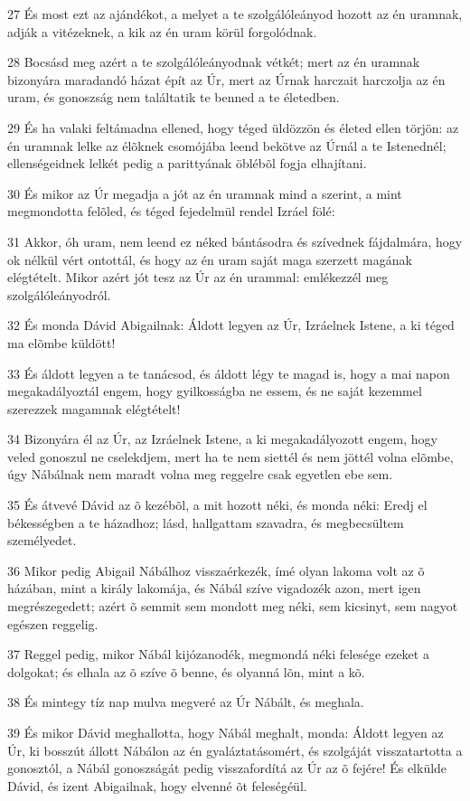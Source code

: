 \par 27 És most ezt az ajándékot, a melyet a te szolgálóleányod hozott az én uramnak, adják a vitézeknek, a kik az én uram körül forgolódnak.
\par 28 Bocsásd meg azért a te szolgálóleányodnak vétkét; mert az én uramnak bizonyára maradandó házat épít az Úr, mert az Úrnak harczait harczolja az én uram, és gonoszság nem találtatik te benned a te életedben.
\par 29 És ha valaki feltámadna ellened, hogy téged üldözzön és életed ellen törjön: az én uramnak lelke az élõknek csomójába leend bekötve az Úrnál a te Istenednél; ellenségeidnek lelkét pedig a parittyának öblébõl fogja elhajítani.
\par 30 És mikor az Úr megadja a jót az én uramnak mind a szerint, a mint megmondotta felõled, és téged fejedelmül rendel Izráel fölé:
\par 31 Akkor, óh uram, nem leend ez néked bántásodra és szívednek fájdalmára, hogy ok nélkül vért ontottál, és hogy az én uram saját maga szerzett magának elégtételt. Mikor azért jót tesz az Úr az én urammal: emlékezzél meg szolgálóleányodról.
\par 32 És monda Dávid Abigailnak: Áldott legyen az Úr, Izráelnek Istene, a ki téged ma elõmbe küldött!
\par 33 És áldott legyen a te tanácsod, és áldott légy te magad is, hogy a mai napon megakadályoztál engem, hogy gyilkosságba ne essem, és ne saját kezemmel szerezzek magamnak elégtételt!
\par 34 Bizonyára él az Úr, az Izráelnek Istene, a ki megakadályozott engem, hogy veled gonoszul ne cselekdjem, mert ha te nem siettél és nem jöttél volna elõmbe, úgy Nábálnak nem maradt volna meg reggelre csak egyetlen ebe sem.
\par 35 És átvevé Dávid az õ kezébõl, a mit hozott néki, és monda néki: Eredj el békességben a te házadhoz; lásd, hallgattam szavadra, és megbecsültem személyedet.
\par 36 Mikor pedig Abigail Nábálhoz visszaérkezék, ímé olyan lakoma volt az õ házában, mint a király lakomája, és Nábál szíve vigadozék azon, mert igen megrészegedett; azért õ semmit sem mondott meg néki, sem kicsinyt, sem nagyot egészen reggelig.
\par 37 Reggel pedig, mikor Nábál kijózanodék, megmondá néki felesége ezeket a dolgokat; és elhala az õ szíve õ benne, és olyanná lõn, mint a kõ.
\par 38 És mintegy tíz nap mulva megveré az Úr Nábált, és meghala.
\par 39 És mikor Dávid meghallotta, hogy Nábál meghalt, monda: Áldott legyen az Úr, ki bosszút állott Nábálon az én gyaláztatásomért, és szolgáját visszatartotta a gonosztól, a Nábál gonoszságát pedig visszafordítá az Úr az õ fejére! És elkülde Dávid, és izent Abigailnak, hogy elvenné õt feleségéül.

